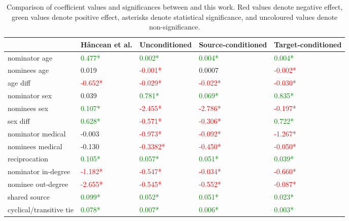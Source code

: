 \begin{table}[htbp]
	\centering
	\footnotesize
	\begin{mdframed}
		\begin{tabular*}{\linewidth}{l|llll}
			\hline
			\textbf{ } & H\^ancean et al. & Unconditioned & Source-conditioned & Target-conditioned\\
			\hline
			nominator age & \textcolor{green}{0.477*} & \textcolor{green}{0.002*} & \textcolor{green}{0.004*} & \textcolor{green}{0.004*}\\
			nominees age & 0.019 & \textcolor{red}{-0.001*} & 0.0007 & \textcolor{red}{-0.002*}\\
			age diff & \textcolor{red}{-0.652*} & \textcolor{red}{-0.029*} & \textcolor{red}{-0.022*} & \textcolor{red}{-0.030*}\\
			nominator sex & 0.039 & \textcolor{green}{0.781*} & \textcolor{green}{0.069*} & \textcolor{green}{0.835*}\\
			nominees sex & \textcolor{green}{0.107*} & \textcolor{red}{-2.455*} & \textcolor{red}{-2.786*} & \textcolor{red}{-0.197*}\\
			sex diff & \textcolor{green}{0.628*} & \textcolor{red}{-0.571*} & \textcolor{red}{-0.306*} & \textcolor{green}{0.722*}\\
			nominator medical & -0.003 & \textcolor{red}{-0.973*} & \textcolor{red}{-0.092*} & \textcolor{red}{-1.267*}\\
			nominees medical & -0.130 & \textcolor{red}{-0.3382*}  & \textcolor{red}{-0.450*} & \textcolor{red}{-0.050*}\\
			reciprocation & \textcolor{green}{0.105*} & \textcolor{green}{0.057*} & \textcolor{green}{0.051*} & \textcolor{green}{0.039*}\\
			nominator in-degree & \textcolor{red}{-1.182*} & \textcolor{red}{-0.547*} & \textcolor{red}{-0.034*} & \textcolor{red}{-0.660*}\\
			nominee out-degree & \textcolor{red}{-2.655*} & \textcolor{red}{-0.545*} & \textcolor{red}{-0.552*} & \textcolor{red}{-0.087*}\\
			shared source & \textcolor{green}{0.099*} & \textcolor{green}{0.052*} & \textcolor{green}{0.051*} & \textcolor{green}{0.023*}\\
			cyclical/transitive tie & \textcolor{green}{0.078*} & \textcolor{green}{0.007*} & \textcolor{green}{0.006*} & \textcolor{green}{0.003*}\\
			\hline
		\end{tabular*}
	\end{mdframed}
	\caption{Comparison of coefficient values and significances between \cite{hancean2022occupations} and this work. Red values denote negative effect, green values denote positive effect, asterisks denote statistical significance, and uncoloured values denote non-significance.}
	\label{tab:rhem_repro_table}
\end{table}

